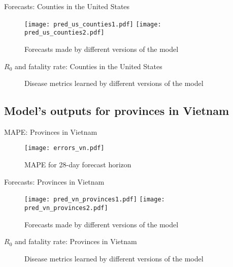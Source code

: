 \begin{frame}{Forecasts: Counties in the United States}
    \begin{figure}[!htb]
        \centering
        \texttt{[image: pred\_us\_counties1.pdf]}
        \texttt{[image: pred\_us\_counties2.pdf]}
        \caption{Forecasts made by different versions of the model}
    \end{figure}
\end{frame}

\begin{frame}{$R_0$ and fatality rate: Counties in the United States}
    \begin{figure}[!htb]
        \centering
        \caption{Disease metrics learned by different versions of the model}
    \end{figure}
\end{frame}

\subsection{Model's outputs for provinces in Vietnam}

\begin{frame}{MAPE: Provinces in Vietnam}
    \begin{figure}[h]
        \centering
        \texttt{[image: errors\_vn.pdf]}
        \caption{MAPE for 28-day forecast horizon}
    \end{figure}
\end{frame}

\begin{frame}{Forecasts: Provinces in Vietnam}
    \begin{figure}[!htb]
        \centering
        \texttt{[image: pred\_vn\_provinces1.pdf]}
        \texttt{[image: pred\_vn\_provinces2.pdf]}
        \caption{Forecasts made by different versions of the model}
    \end{figure}
\end{frame}

\begin{frame}{$R_0$ and fatality rate: Provinces in Vietnam}
    \begin{figure}[!htb]
        \centering
        \caption{Disease metrics learned by different versions of the model}
    \end{figure}
\end{frame}